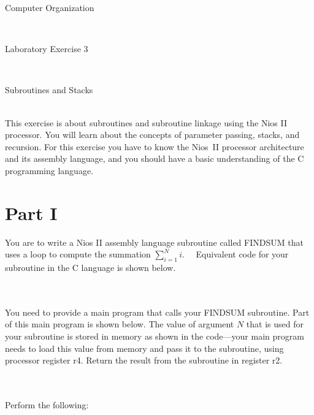 \documentclass[epsfig,10pt,fullpage]{article}
\newcommand{\LabNum}{3}
\begin{document}
\centerline{\huge Computer Organization}
~\\
\centerline{\huge Laboratory Exercise \LabNum}
~\\
\centerline{\large Subroutines and Stacks}
~\\

This exercise is about subroutines and subroutine linkage using the Nios\textsuperscript{\textregistered} II processor.  You will 
learn about the concepts of parameter passing, stacks, and recursion.  For this 
exercise you have to know the Nios~II processor architecture and its assembly language, and 
you should have a basic understanding of the C programming language. 

\section*{Part I}
You are to write a Nios II assembly language subroutine called FINDSUM that uses a loop to 
compute the summation
$\displaystyle\sum_{i=1}^{N} i$.
~~Equivalent code for your subroutine in the C language is shown below. 

~\\

~\\
You need to provide a main program that calls your FINDSUM subroutine.
Part of this main program is shown below.
The value of argument $N$ that is used for your subroutine is stored
in memory as shown in the code---your main program needs to load this value from memory and pass 
it to the subroutine, using processor register r4. Return the result from the subroutine
in register r2.

~\\

~\\

Perform the following:
\end{document}
